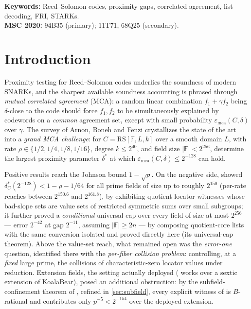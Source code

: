 \documentclass[11pt]{article}
\theoremstyle{definition}
\theoremstyle{remark}
\newcommand{\F}{\mathbb{F}}
\newcommand{\B}{B}
\newcommand{\RS}{\mathrm{RS}}
\newcommand{\emca}{\varepsilon_{\mathrm{mca}}}
\begin{document}
\medskip
\noindent\textbf{Keywords:} Reed--Solomon codes, proximity gaps, correlated agreement, list decoding, FRI, STARKs.\\
\textbf{MSC 2020:} 94B35 (primary); 11T71, 68Q25 (secondary).

{\small\setcounter{tocdepth}{2}\tableofcontents}

\section{Introduction}\label{sec:intro}

Proximity testing for Reed--Solomon codes underlies the soundness of modern SNARKs, and the sharpest available soundness accounting is phrased through \emph{mutual correlated agreement} (MCA): a random linear combination $f_1+\gamma f_2$ being $\delta$-close to the code should force $f_1,f_2$ to be simultaneously explained by codewords on a \emph{common} agreement set, except with small probability $\emca(C,\delta)$ over $\gamma$. The survey of Arnon, Boneh and Fenzi \cite{ABF26} crystallizes the state of the art into a \emph{grand MCA challenge}: for $C=\RS[\F,L,k]$ over a smooth domain $L$, with rate $\rho\in\{1/2,1/4,1/8,1/16\}$, degree $k\le2^{40}$, and field size $|\F|<2^{256}$, determine the largest proximity parameter $\delta^*$ at which $\emca(C,\delta)\le2^{-128}$ can hold.

Positive results reach the Johnson bound $1-\sqrt\rho$. On the negative side, \cite{Cho26b} showed $\delta^*_C(2^{-128})<1-\rho-1/64$ for all prime fields of size up to roughly $2^{150}$ (per-rate reaches between $2^{150.6}$ and $2^{161.8}$), by exhibiting quotient-locator witnesses whose bad-slope sets are value sets of restricted symmetric sums over small subgroups; it further proved a \emph{conditional} universal cap over every field of size at most $2^{256}$ --- error $2^{-42}$ at gap $2^{-11}$, assuming $|\F|\ge2n$ --- by composing quotient-core lists with the same conversion isolated and proved directly here (its universal-cap theorem). Above the value-set reach, what remained open was the \emph{error-one} question, identified there with the \emph{per-fiber collision problem}: controlling, at a \emph{fixed} large prime, the collisions of characteristic-zero locator values under reduction. Extension fields, the setting actually deployed (\cite[\S6.3]{ABF26} works over a sextic extension of KoalaBear), posed an additional obstruction: by the subfield-confinement theorem of \cite{Cho26b}, refined in \cref{sec:subfield}, every explicit witness of \cite{Cho26a,Cho26b} is $\B$-rational and contributes only $p^{-5}<2^{-154}$ over the deployed extension.
\end{document}
